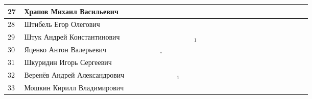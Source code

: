 \documentclass[a4paper,11pt]{article}
\newcommand*\Ok{&\small \ding{51}$\!\!_\circ$} %
\newcommand*\ok{&{\small \ding{51}}} %
\newcommand*\no{&{\small }} %
\newcommand*\da{&{\small\ding{48}$\!\!_1$}} %
\begin{document}
\begin{tabular}{p{7pt}|l|p{6pt}p{6pt}p{6pt}p{6pt}p{6pt}p{6pt}p{6pt}p{6pt}p{6pt}p{6pt}p{6pt}p{6pt}p{6pt}p{6pt}p{6pt}p{6pt}p{6pt}p{6pt}p{6pt}p{6pt}p{6pt}p{6pt}p{6pt}p{6pt}}
27\,&Храпов Михаил Васильевич		\ok\ok\ok\ok\no\no\ok\ok\ok\\
\midrule
28\,&Штибель Егор Олегович		\no\no\ok\\
29\,&Штук Андрей Константинович		\ok\ok\ok\ok\ok\ok\no\ok\da\\
30\,&Яценко Антон Валерьевич		\ok\ok\ok\ok\Ok\no\ok\no\ok\\
31\,&Шкуридин Игорь Сергеевич		\ok\no\ok\ok\ok\ok\ok\ok\no\\
32\,&Веренёв Андрей Александрович	\ok\ok\ok\ok\ok\ok\da\no\ok\\
33\,&Мошкин Кирилл Владимирович		\ok\ok\ok\ok\ok\ok\no\ok\ok\\
\bottomrule
\end{tabular} 

\newpage
%
\hspace{-2.1cm}
\end{document}
